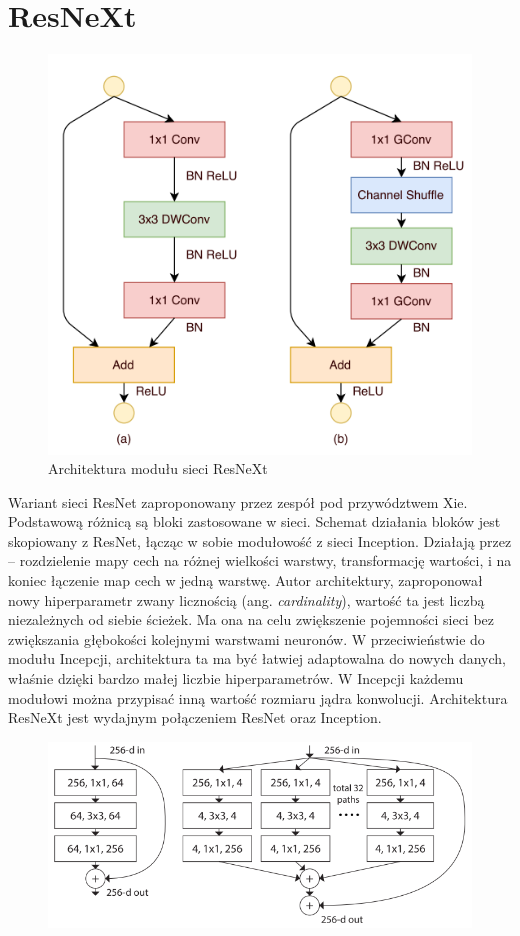 \documentclass[12pt,a4paper,twoside,titlepage,openright]{book}
\begin{document}
\section{ResNeXt}
\begin{figure}[h]
	\centering
			\includegraphics[resolution=100, scale=0.9]{ResNeXt.png}
		\caption{Architektura modułu sieci ResNeXt}
\end{figure}
Wariant sieci ResNet zaproponowany przez zespół pod przywództwem Xie. Podstawową różnicą są bloki zastosowane w sieci. Schemat działania bloków jest skopiowany z ResNet, łącząc w sobie modułowość z sieci Inception. Działają przez -- rozdzielenie mapy cech na różnej wielkości warstwy, transformację wartości, i na koniec łączenie map cech w jedną warstwę. Autor architektury, zaproponował nowy hiperparametr zwany licznością (ang. \textit{cardinality}), wartość ta jest liczbą niezależnych od siebie ścieżek. Ma ona na celu zwiększenie pojemności sieci bez zwiększania głębokości kolejnymi warstwami neuronów. W przeciwieństwie do modułu Incepcji, architektura ta ma być łatwiej adaptowalna do nowych danych, właśnie dzięki bardzo małej liczbie hiperparametrów. W Incepcji każdemu modułowi można przypisać inną wartość rozmiaru jądra konwolucji. Architektura ResNeXt jest wydajnym połączeniem ResNet oraz Inception. \cite{DBLP:journals/corr/XieGDTH16}

\begin{figure}[ht]
	\centering
			\includegraphics[resolution=100]{resnextModule.png}
		\caption{}
				\label{fig:resnextModule}
\end{figure}
\end{document}
